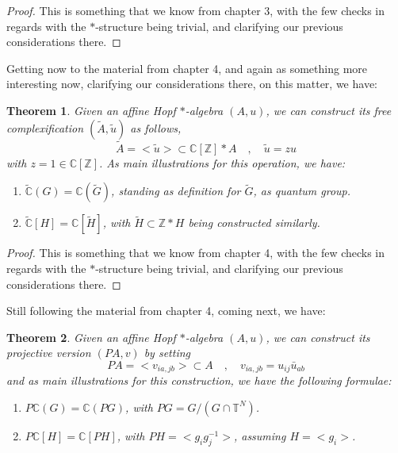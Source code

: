 \documentclass[12pt]{amsbook}
\newtheorem{theorem}{Theorem}[chapter]
\begin{document}
\begin{proof}
This is something that we know from chapter 3, with the few checks in regards with the $*$-structure being trivial, and clarifying our previous considerations there. 
\end{proof}

Getting now to the material from chapter 4, and again as something more interesting now, clarifying our considerations there, on this matter, we have:

\begin{theorem}
Given an affine Hopf $*$-algebra $(A,u)$, we can construct its free complexification $(\widetilde{A},\tilde{u})$ as follows,
$$\widetilde{A}=<\tilde{u}>\subset\mathbb C[\mathbb Z]*A\quad,\quad\tilde{u}=zu$$
with $z=1\in\mathbb C[\mathbb Z]$. As main illustrations for this operation, we have:
\begin{enumerate}
\item $\widetilde{\mathbb C}(G)=\mathbb C(\widetilde{G})$, standing as definition for $\widetilde{G}$, as quantum group.

\item $\widetilde{\mathbb C}[H]=\mathbb C[\widetilde{H}]$, with $\widetilde{H}\subset\mathbb Z*H$ being constructed similarly.
\end{enumerate}
\end{theorem}

\begin{proof}
This is something that we know from chapter 4, with the few checks in regards with the $*$-structure being trivial, and clarifying our previous considerations there. 
\end{proof}

Still following the material from chapter 4, coming next, we have:

\begin{theorem}
Given an affine Hopf $*$-algebra $(A,u)$, we can construct its projective version $(PA,v)$ by setting
$$PA=<v_{ia,jb}>\subset A\quad,\quad v_{ia,jb}=u_{ij}\bar{u}_{ab}$$
and as main illustrations for this construction, we have the following formulae:
\begin{enumerate}
\item $P\mathbb C(G)=\mathbb C(PG)$, with $PG=G/(G\cap\mathbb T^N)$.

\item $P\mathbb C[H]=\mathbb C[PH]$, with $PH=<g_ig_j^{-1}>$, assuming $H=<g_i>$.
\end{enumerate}
\end{theorem}
\end{document}
